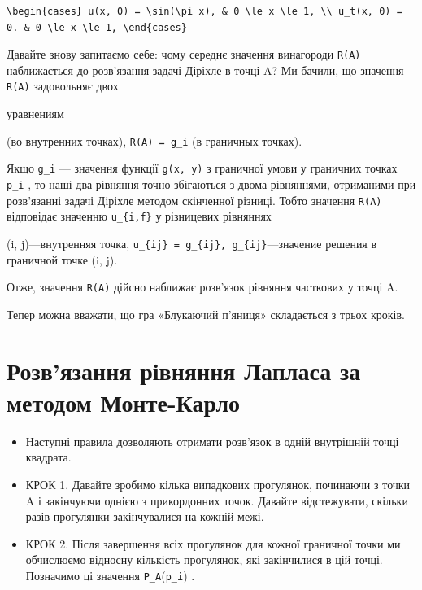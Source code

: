 \documentclass[
  ukrainian,
]{article}
\begin{document}
\begin{verbatim}
\begin{cases} u(x, 0) = \sin(\pi x), & 0 \le x \le 1, \\ u_t(x, 0) = 0. & 0 \le x \le 1, \end{cases}
\end{verbatim}

Давайте знову запитаємо себе: чому середнє значення винагороди
\texttt{R(A)} наближається до розв'язання задачі Діріхле в точці A? Ми
бачили, що значення \texttt{R(A)} задовольняє двох

уравнениям

(во внутренних точках), \texttt{R(A)\ =\ g\_i} (в граничных точках).

Якщо \texttt{g\_i} --- значення функції \texttt{g(x,\ y)} з граничної
умови у граничних точках \texttt{p\_i} , то наші два рівняння точно
збігаються з двома рівняннями, отриманими при розв'язанні задачі Діріхле
методом скінченної різниці. Тобто значення \texttt{R(A)} відповідає
значенню \texttt{u\_\{i,f\}} у різницевих рівняннях

(i, j)---внутренняя точка,
\texttt{u\_\{ij\}\ =\ g\_\{ij\},\ g\_\{ij\}}---значение решения в
граничной точке (i, j).

Отже, значення \texttt{R(A)} дійсно наближає розв'язок рівняння
часткових у точці A.

Тепер можна вважати, що гра «Блукаючий п'яниця» складається з трьох
кроків.

\section{Розв'язання рівняння Лапласа за методом
Монте-Карло}\label{ux440ux43eux437ux432ux44fux437ux430ux43dux43dux44f-ux440ux456ux432ux43dux44fux43dux43dux44f-ux43bux430ux43fux43bux430ux441ux430-ux437ux430-ux43cux435ux442ux43eux434ux43eux43c-ux43cux43eux43dux442ux435-ux43aux430ux440ux43bux43e}

\begin{itemize}
\item
  Наступні правила дозволяють отримати розв'язок в одній внутрішній
  точці квадрата.
\item
  КРОК 1. Давайте зробимо кілька випадкових прогулянок, починаючи з
  точки A і закінчуючи однією з прикордонних точок. Давайте
  відстежувати, скільки разів прогулянки закінчувалися на кожній межі.
\item
  КРОК 2. Після завершення всіх прогулянок для кожної граничної точки ми
  обчислюємо відносну кількість прогулянок, які закінчилися в цій точці.
  Позначимо ці значення \texttt{P\_A}(\texttt{p\_i}) .
\end{itemize}
\end{document}
